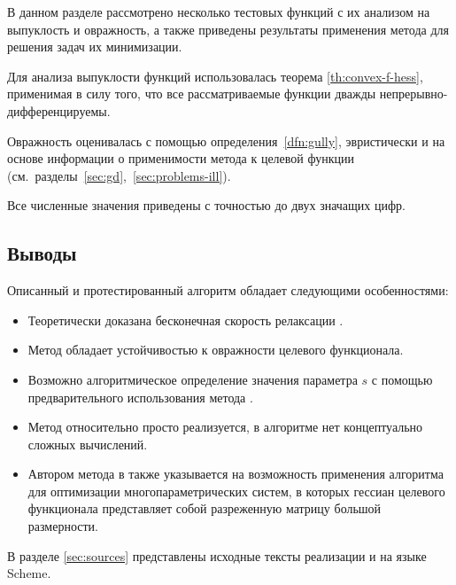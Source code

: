 В данном разделе рассмотрено несколько тестовых функций с их анализом
на выпуклость и овражность, а также приведены результаты применения
метода \relch{} для решения задач их минимизации. 

Для анализа выпуклости функций использовалась теорема
\ref{th:convex-f-hess}, применимая в силу того, что все
рассматриваемые функции дважды непрерывно-дифференцируемы.

Овражность оценивалась с помощью определения \ref{dfn:gully},
эвристически и на основе информации о применимости метода \gd{} к
целевой функции (см. разделы \ref{sec:gd}, \ref{sec:problems-ill}).

Все численные значения приведены с точностью до двух значащих цифр.




\clearpage


\clearpage


\clearpage


\subsection{Выводы}

Описанный и протестированный алгоритм \relch{} обладает следующими
особенностями:
\begin{itemize}
\item Теоретически доказана бесконечная скорость релаксации \relch{}.
\item Метод \relch{} обладает устойчивостью к овражности целевого
  функционала.
\item Возможно алгоритмическое определение значения параметра $s$ с
  помощью предварительного использования метода \gd{}.
\item Метод относительно просто реализуется, в алгоритме нет
  концептуально сложных вычислений.
\item Автором метода в \cite{chernorutsky04} также указывается на
  возможность применения алгоритма для оптимизации
  многопараметрических систем, в которых гессиан целевого функционала
  представляет собой разреженную матрицу большой размерности.
\end{itemize}

В разделе \ref{sec:sources} представлены исходные тексты реализации
\relch{} и \gdrelch{} на языке Scheme.
